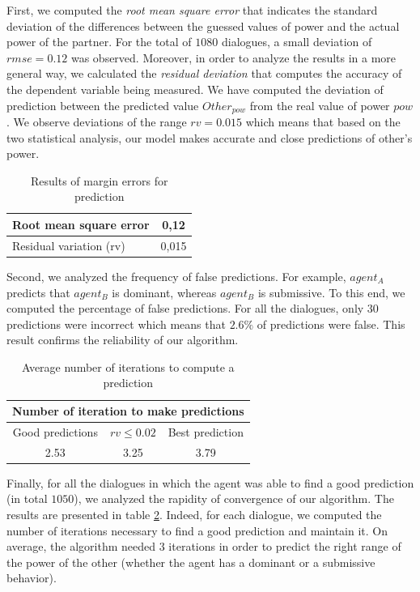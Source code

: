 \documentclass[conference, letterpaper]{IEEEtran}
\begin{document}
	First, we computed the \emph{root mean square error} that indicates the standard deviation of the differences between the guessed  values of power and the actual power of the partner. For the total of $1080$ dialogues, a small deviation of $rmse= 0.12$ was observed. Moreover, in order to analyze the results in a more general way, we calculated the \emph{residual deviation}  that computes the accuracy of the dependent variable being measured. We have computed the deviation of prediction between the predicted value  $Other_{pow}$ from the real value of power $pow$. 
	We observe deviations of the range $rv = 0.015$ which means that based on the two statistical analysis, our model makes accurate and close predictions of other's power.
	
	
	\begin{table}[h]
		\centering
		\large
		\caption{Results of margin errors for prediction} 
		\begin{tabular}{|l|c|}
			\hline
			Root mean square error & 0,12 \\
			\hline
			Residual variation (rv) & 0,015 \\
			\hline
		\end{tabular}
		
		\label{tab:res1}
	\end{table}
	
	Second, we analyzed the frequency of false predictions. For example, $agent_A$ predicts that $agent_B$ is dominant, whereas $agent_B$ is submissive. To this end, we computed the percentage of false predictions. For all the dialogues, only $30$ predictions were incorrect which means that $ 2.6 \% $ of predictions were false. This result confirms the reliability of our algorithm. 
	\begin{table}[h]
		\centering
		\large
		\begin{tabular}{|c|c|c|}
			\hline
			\multicolumn{3}{|c|}{Number of iteration to make predictions} \\
			\hline
			Good predictions & $rv \leq 0.02$ & Best prediction \\
			\hline
			2.53 & 3.25 & 3.79\\
			\hline
		\end{tabular}
		\caption{Average number of iterations to compute a prediction} 
		\label{tab:conv}
	\end{table}
	Finally, for all the dialogues in which the agent was able to find a good prediction (in total $1050$), we analyzed the rapidity of convergence of our algorithm. The results are presented in table \ref{tab:conv}. Indeed, for each dialogue, we computed the number of iterations necessary to find a good prediction and maintain it. On average, the algorithm needed $3$ iterations in order to predict the right range of the power of the other (whether the agent has a dominant or a submissive behavior). 
	
\end{document}
